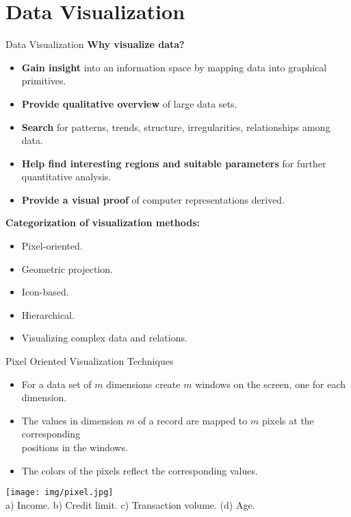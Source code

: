 \section{Data Visualization}

\begin{frame}{Data Visualization}
	\textbf{Why visualize data?}
	\begin{itemize}
		\item \textbf{Gain insight} into an information space by mapping data into graphical primitives.
		\item \textbf{Provide qualitative overview} of large data sets.
		\item \textbf{Search} for patterns, trends, structure, irregularities, relationships among data.
		\item \textbf{Help find interesting regions and suitable parameters} for further quantitative analysis.
		\item \textbf{Provide a visual proof} of computer representations derived.
	\end{itemize}
	\textbf{Categorization of visualization methods:}
	\begin{itemize}
		\item Pixel-oriented.
		\item Geometric projection.
		\item Icon-based.
		\item Hierarchical.
		\item Visualizing complex data and relations.
	\end{itemize}
\end{frame}

\begin{frame}{Pixel Oriented Visualization Techniques}
	\begin{itemize}
		\item For a data set of $m$ dimensions create $m$ windows on the screen, one for each dimension.
		\item The values in dimension $m$ of a record are mapped to $m$ pixels at the corresponding \\ positions in the windows.
		\item The colors of the pixels reflect the corresponding values.
	\end{itemize}
	\vspace{0.5cm}
	\centering
	\texttt{[image: img/pixel.jpg]}\\
	a) Income. \hspace{0.3cm} b) Credit limit. \hspace{0.2cm} c) Transaction volume. \hspace{0.2cm} (d) Age.
\end{frame}

